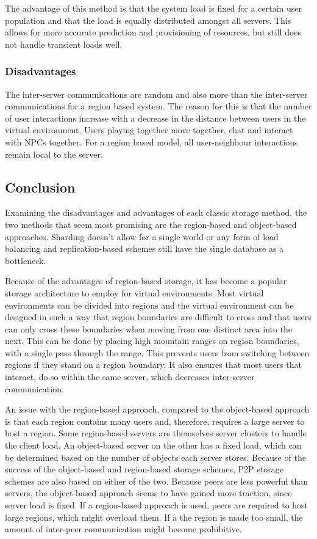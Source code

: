 The advantage of this method is that the system load is fixed for a certain user population and that the load is equally distributed amongst all servers. This allows for more accurate prediction and provisioning of resources, but still does not handle transient loads well.

\subsubsection{Disadvantages}

The inter-server communications are random and also more than the inter-server communications for a region based system. The reason for this is that the number of user interactions increase with a decrease in the distance
between users in the virtual environment. Users playing together move together, chat and interact with NPCs together. For a region based model, all user-neighbour interactions remain local to the server.

\subsection{Conclusion}

Examining the disadvantages and advantages of each classic storage method, the two methods that seem most promising are the region-based and object-based approaches. Sharding doesn't allow for a single world or any form of load balancing and replication-based schemes still have the single database as a bottleneck.

Because of the advantages of region-based storage, it has become a popular storage architecture to employ for virtual environments. Most virtual environments can be divided into regions and the virtual environment can be designed in such a way that region boundaries are difficult to cross and that users can only cross these boundaries when moving from one distinct area into the next. This can be done by placing high mountain ranges on region boundaries, with a single pass through the range. This prevents users from switching between regions if they stand on a region boundary. It also ensures that most users that interact, do so within the same server, which decreases inter-server communication.

An issue with the region-based approach, compared to the object-based approach is that each region contains many users and, therefore, requires a large server to host a region. Some region-based servers are themselves server clusters to handle the client load. An object-based server on the other has a fixed load, which can be determined based on the number of objects each server stores.
Because of the success of the object-based and region-based storage schemes, P2P storage schemes are also based on either of the two. Because peers are less powerful than servers, the object-based approach seems to have gained more traction, since server load is fixed. If a region-based approach is used, peers are required to host large regions, which might overload them. If a the region is made too small, the amount of inter-peer communication might become prohibitive.

